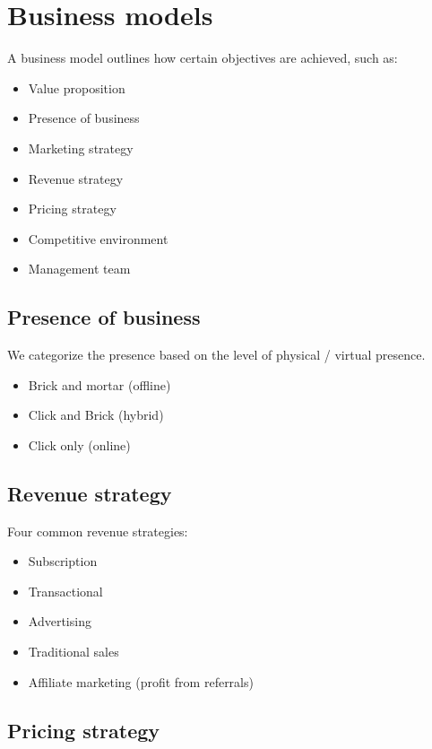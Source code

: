 \section{Business models}

A business model outlines how certain objectives are achieved, such as:

\begin{itemize}
    \item Value proposition
    \item Presence of business
    \item Marketing strategy
    \item Revenue strategy
    \item Pricing strategy
    \item Competitive environment
    \item Management team
\end{itemize}

\subsection{Presence of business}

We categorize the presence based on the level of physical / virtual presence.

\begin{itemize}
    \item Brick and mortar (offline)
    \item Click and Brick (hybrid)
    \item Click only (online)
\end{itemize}

\subsection{Revenue strategy}

Four common revenue strategies:

\begin{itemize}
    \item Subscription
    \item Transactional
    \item Advertising
    \item Traditional sales
    \item Affiliate marketing (profit from referrals)
\end{itemize}

\subsection{Pricing strategy}

